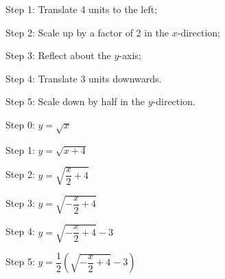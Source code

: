\documentclass[12pt]{report}
\begin{document}
\begin{enumerate}
            Step 1: Translate 4 units to the left;

            Step 2: Scale up by a factor of 2 in the $x$-direction;

            Step 3: Reflect about the $y$-axis;

            Step 4: Translate 3 units downwards.

            Step 5: Scale down by half in the $y$-direction.

            \sol{}
            \begin{multicols}{2}
                  Step 0: $y = \sqrt{x}$

                  Step 1: $y = \sqrt{x+4}$

                  Step 2: $y = \sqrt{\dfrac{x}{2} + 4}$

                  Step 3: $y = \sqrt{-\dfrac{x}{2} + 4}$

                  Step 4: $y = \sqrt{-\dfrac{x}{2} + 4} - 3$

                  Step 5: $y = \dfrac{1}{2}\left(\sqrt{-\dfrac{x}{2} + 4} - 3\right)$
            \end{multicols}


\end{enumerate}
\end{document}
